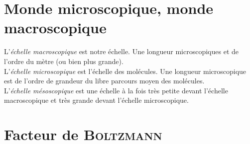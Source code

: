 \documentclass[11pt,a4paper,fleqn,pdftex]{report}
\begin{document}
\section{Monde microscopique, monde macroscopique} %
\label{sec:monde_microscopique_monde_macroscopique}
\begin{dfn}
   L'\emph{échelle macroscopique} est notre échelle. Une longueur microscopiques et de l'ordre du mètre (ou bien plus grande).\\
   L'\emph{échelle microscopique} est l'échelle des molécules. Une longueur microscopique est de l'ordre de grandeur du libre parcours moyen des molécules. \\
   L'\emph{échelle mésoscopique} est une échelle à la fois très petite devant l'échelle macroscopique et très grande devant l'échelle microscopique. 
\end{dfn}
\section{Facteur de \textsc{Boltzmann}} %
\label{sec:facteur_de_boltzmann}
\end{document}
